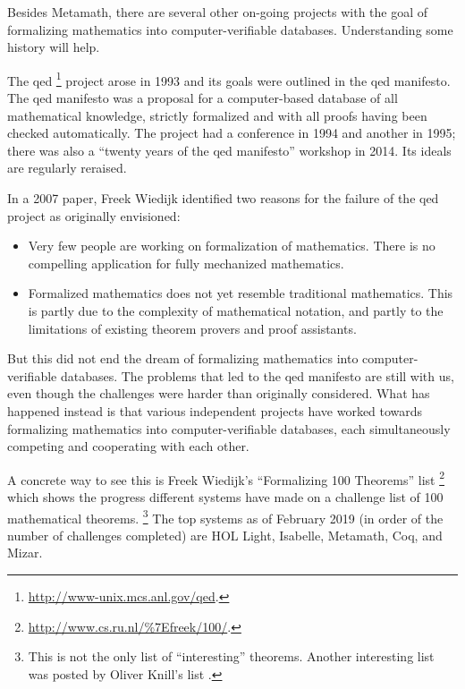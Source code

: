 Besides Metamath, there are several other on-going projects with the goal of
formalizing mathematics into computer-verifiable databases.
Understanding some history will help.

The {\sc qed}%
\footnote{\url{http://www-unix.mcs.anl.gov/qed}.}
project arose in 1993 and its goals were outlined in the
{\sc qed} manifesto.
The {\sc qed} manifesto was
a proposal for a computer-based database of all mathematical knowledge,
strictly formalized and with all proofs having been checked automatically.
The project had a conference in 1994 and another in 1995;
there was also a ``twenty years of the {\sc qed} manifesto'' workshop
in 2014.
Its ideals are regularly reraised.

In a 2007 paper, Freek Wiedijk identified two reasons
for the failure of the {\sc qed} project as originally envisioned:%
\cite{Wiedijk-revisited}

\begin{itemize}
\item Very few people are working on formalization of mathematics. There is no compelling application for fully mechanized mathematics.
\item Formalized mathematics does not yet resemble traditional mathematics. This is partly due to the complexity of mathematical notation, and partly to the limitations of existing theorem provers and proof assistants.
\end{itemize}

But this did not end the dream of
formalizing mathematics into computer-verifiable databases.
The problems that led to the {\sc qed} manifesto are still with us,
even though the challenges were harder than originally considered.
What has happened instead is that various independent projects have
worked towards formalizing mathematics into computer-verifiable databases,
each simultaneously competing and cooperating with each other.

A concrete way to see this is
Freek Wiedijk's ``Formalizing 100 Theorems'' list%
\footnote{\url{http://www.cs.ru.nl/\%7Efreek/100/}.}
which shows the progress different systems have made on a challenge list
of 100 mathematical theorems.%
\footnote{ This is not the only list of ``interesting'' theorems.
Another interesting list was posted by Oliver Knill's list
\cite{Knill}.}
The top systems as of February 2019
(in order of the number of challenges completed) are
HOL Light, Isabelle, Metamath, Coq, and Mizar.

